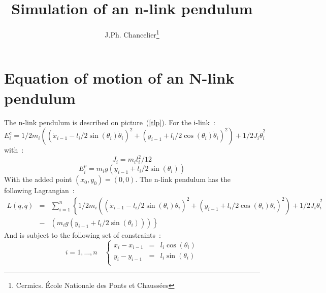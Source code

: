 \documentclass[11pt]{article}
\title{Simulation of an n-link pendulum}
\author{J.Ph. Chancelier\thanks{Cermics. \'Ecole Nationale des Ponts et Chauss\'ees}}
\begin{document}
\maketitle

\def\tenrm{\size{10}{11pt}\shape{n}\family{cmr}\selectfont} 
\def\elvrm{\size{11}{12pt}\shape{n}\family{cmr}\selectfont} 
\def\sixrm{\size{6}{7pt}\shape{n}\family{cmr}\selectfont} 
\def\sevrm{}%
\def\dotx{\dot{x}}
\def\doty{\dot{y}}
\def\dotq{\dot{q}}
\def\dotth{\dot{\theta}}



\section{Equation of motion of an N-link pendulum}
The n-link pendulum is described on picture~(\ref{tlp}).
For the i-link~:
\begin{equation}
	E_i^c = 
	 1/2 m_i \left( (\dotx_{i-1} - l_i/2 \sin(\theta_i)\dotth_i)^2 +
	(\doty_{i-1}+ l_i/2 \cos(\theta_i)\dotth_i)^2 \right)
	+1/2 J_i \dot{\theta}_i^2
\end{equation}
with~:
\begin{equation}
	J_i= m_i l_i^2/12 
\end{equation}
\begin{equation}
	E_i^p= m_i g \left( y_{i-1} + l_i/2 \sin(\theta_i)\right)
\end{equation}
With the added point $(x_0,y_0)=(0,0)$.
The n-link pendulum has the following Lagrangian~:
\begin{eqnarray}
	L(q,\dot{q})&=& 
	\sum_{i=1}^n \left\{
	 1/2 m_i \left( (\dotx_{i-1} - l_i/2 \sin(\theta_i)\dotth_i)^2 +
	(\doty_{i-1}+ l_i/2 \cos(\theta_i)\dotth_i)^2 \right)
	+1/2 J_i \dot{\theta}_i^2 \right.\\
	&-& \left. \left( m_i g \left( y_{i-1} + l_i/2 \sin(\theta_i)\right)\right)
	\right\}
\end{eqnarray}
And is subject to the following set of constraints~:
\begin{equation}
	i=1,\ldots,n \quad \left\{
	\begin{array}{lcl}
	 x_i -x_{i-1} &=& l_i \cos(\theta_i) \\
	 y_i -y_{i-1} &=& l_i \sin(\theta_i) \\
	\end{array} \right.
\label{const1}
\end{equation}
\end{document}
